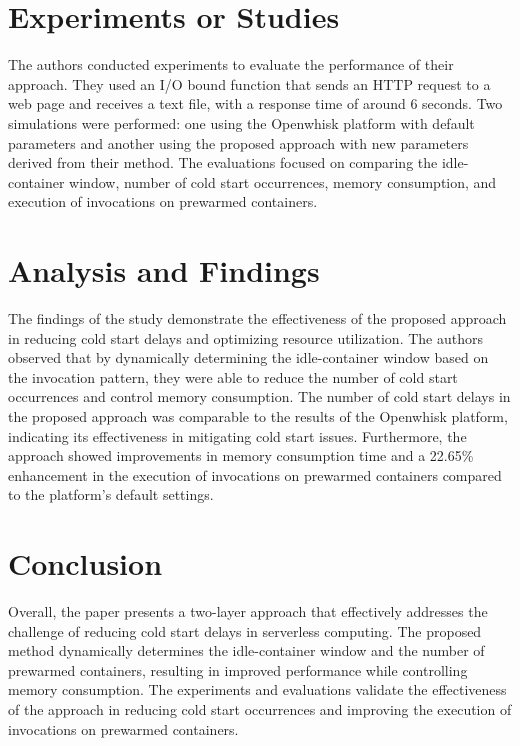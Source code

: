 \chapter{Experiments or Studies}
\label{chp:4}
The authors conducted experiments to evaluate the performance of their approach. They used an I/O bound function that sends an HTTP request to a web page and receives a text file, with a response time of around 6 seconds. Two simulations were performed: one using the Openwhisk platform with default parameters and another using the proposed approach with new parameters derived from their method. The evaluations focused on comparing the idle-container window, number of cold start occurrences, memory consumption, and execution of invocations on prewarmed containers.
\chapter{Analysis and Findings}
\label{chp:5}
The findings of the study demonstrate the effectiveness of the proposed approach in reducing cold start delays and optimizing resource utilization. The authors observed that by dynamically determining the idle-container window based on the invocation pattern, they were able to reduce the number of cold start occurrences and control memory consumption. The number of cold start delays in the proposed approach was comparable to the results of the Openwhisk platform, indicating its effectiveness in mitigating cold start issues. Furthermore, the approach showed improvements in memory consumption time and a 22.65\% enhancement in the execution of invocations on prewarmed containers compared to the platform's default settings.
\chapter{Conclusion}
\label{chp:6}
Overall, the paper presents a two-layer approach that effectively addresses the challenge of reducing cold start delays in serverless computing. The proposed method dynamically determines the idle-container window and the number of prewarmed containers, resulting in improved performance while controlling memory consumption. The experiments and evaluations validate the effectiveness of the approach in reducing cold start occurrences and improving the execution of invocations on prewarmed containers.


\newpage

